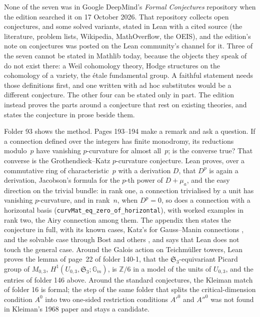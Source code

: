 \documentclass[runningheads,a4paper]{llncs}
\newcommand{\lean}[1]{\texttt{#1}}
\begin{document}
None of the seven was in Google DeepMind's \emph{Formal Conjectures} repository \cite{formalconjectures} when the edition searched it on 17 October 2026. That repository collects open conjectures, and some solved variants, stated in Lean with a cited source (the literature, problem lists, Wikipedia, MathOverflow, the OEIS), and the edition's note on conjectures was posted on the Lean community's channel for it. Three of the seven cannot be stated in Mathlib today, because the objects they speak of do not exist there: a Weil cohomology theory, Hodge structures on the cohomology of a variety, the étale fundamental group. A faithful statement needs those definitions first, and one written with ad hoc substitutes would be a different conjecture. The other four can be stated only in part. The edition instead proves the parts around a conjecture that rest on existing theories, and states the conjecture in prose beside them.

Folder 93 shows the method. Pages 193--194 make a remark and ask a question. If a connection defined over the integers has finite monodromy, its reductions modulo~$p$ have vanishing $p$-curvature for almost all~$p$; is the converse true? That converse is the Grothendieck--Katz $p$-curvature conjecture. Lean proves, over a commutative ring of characteristic~$p$ with a derivation $D$, that $D^p$ is again a derivation, Jacobson's formula for the $p$-th power of $D + \mu_a$, and the easy direction on the trivial bundle: in rank one, a connection trivialised by a unit has vanishing $p$-curvature, and in rank~$n$, when $D^p = 0$, so does a connection with a horizontal basis (\lean{curvMat\_eq\_zero\_of\_horizontal}), with worked examples in rank two, the Airy connection among them. The appendix then states the conjecture in full, with its known cases, Katz's for Gauss--Manin connections \cite{katz1972}, and the solvable case through Bost and others \cite{bost2001}, and says that Lean does not touch the general case. Around the Galois action on Teichmüller towers, Lean proves the lemma of page~22 of folder 140-1, that the $\mathfrak S_3$-equivariant Picard group of $M_{0,3}$, $H^1(U_{0,3}, \mathfrak S_3; \mathbb G_m)$, is $\mathbb Z/6$ in a model of the units of $U_{0,3}$, and the entries of folder 146 above. Around the standard conjectures, the Kleiman match of folder 16 is formal; the step of the same folder that splits the critical-dimension condition $A^0$ into two one-sided restriction conditions $A'^0$ and $A''^0$ was not found in Kleiman's 1968 paper and stays a candidate.
\end{document}

